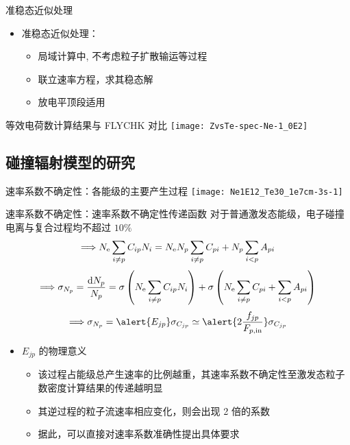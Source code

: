\begin{CJK*}{UTF8}{kai}
\begin{frame}{准稳态近似处理}
	\begin{itemize}%
		\item 准稳态近似处理：%
			\begin{itemize}
				\item 局域计算中, 不考虑粒子扩散输运等过程
				\item 联立速率方程，求其稳态解
				\item 放电平顶段适用
			\end{itemize}
	\end{itemize}

\end{frame}

\begin{frame}{等效电荷数计算结果与 FLYCHK 对比}
	\centering
	\texttt{[image: ZvsTe-spec-Ne-1\_0E2]}
\end{frame}

\subsection{碰撞辐射模型的研究}

\begin{frame}{速率系数不确定性：各能级的主要产生过程}
	\centering
	\texttt{[image: Ne1E12\_Te30\_1e7cm-3s-1]}
\end{frame}

\begin{frame}{速率系数不确定性：速率系数不确定性传递函数}
	\centering
	对于普通激发态能级，电子碰撞电离与复合过程均不超过 $10\%$
	$$\Longrightarrow N_{\rm e}\sum_{i\ne p}C_{ip}N_i=N_{\rm e}N_p\sum_{i\ne p}C_{pi}+N_p\sum_{i<p}A_{pi}$$
	$$\Longrightarrow \sigma_{N_p}=\frac{{\rm d}N_p}{N_p} = \sigma\left(N_{\rm e}\sum_{i\ne p}C_{ip}N_i\right) + \sigma\left(N_{\rm e}\sum_{i\ne p}C_{pi}+\sum_{i<p}A_{pi}\right)$$
	$$\Longrightarrow \sigma_{N_p}=\alert{E_{jp}}\sigma_{C_{jp}}\simeq\alert{2\frac{f_{jp}}{F_{p,{\rm in}}}}\sigma_{C_{jp}}$$
	\begin{itemize}
		\item $E_{jp}$ 的物理意义
			\begin{itemize}
				\item 该过程占能级总产生速率的比例越重，其速率系数不确定性至激发态粒子数密度计算结果的传递越明显
				\item 其逆过程的粒子流速率相应变化，则会出现 2 倍的系数
				\item 据此，可以\alert{直接}对速率系数准确性提出具体要求
			\end{itemize}
	\end{itemize}
\end{frame}


\end{CJK*}
